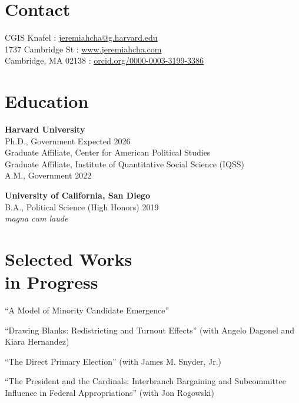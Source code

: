 \documentclass[margin, line]{res}
\begin{document}
\begin{resume}

\section{Contact}
CGIS Knafel \hfill \Letter: \href{mailto:jeremiahcha@g.harvard.edu}{jeremiahcha@g.harvard.edu}\\
1737 Cambridge St \hfill \Mundus: \href{httsp://www.jeremiahcha.com}{www.jeremiahcha.com}\\
Cambridge, MA 02138 \hfill \Mundus: \href{https://orcid.org/0000-0003-3199-3386}{orcid.org/0000-0003-3199-3386}

\section{Education}
\textbf{Harvard University}\\
\hspace*{5mm} Ph.D., Government \hfill Expected 2026\\
\hspace*{10mm}Graduate Affiliate, Center for American Political Studies\\
\hspace*{10mm}Graduate Affiliate, Institute of Quantitative Social Science (IQSS)\\
\hspace*{5mm} A.M., Government \hfill 2022

\textbf{University of California, San Diego}\\
\hspace*{5mm} B.A., Political Science (High Honors) \hfill 2019\\
\hspace*{10mm} \textit{magna cum laude}

\section{Selected Works \\in Progress}
\begin{etaremune}
	\item ``A Model of Minority Candidate Emergence''
	\item ``Drawing Blanks: Redistricting and Turnout Effects'' (with Angelo Dagonel and Kiara Hernandez)
	\item ``The Direct Primary Election'' (with James M. Snyder, Jr.)
	\item ``The President and the Cardinals: Interbranch Bargaining and Subcommittee Influence in Federal Appropriations'' (with Jon Rogowski)
\end{etaremune}


\end{resume}
\end{document}
